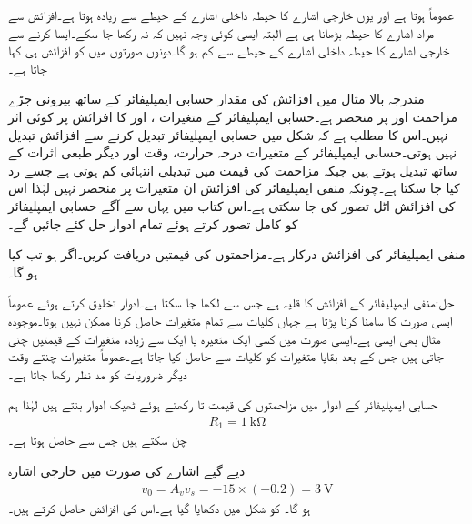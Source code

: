 عموماً  ہوتا ہے اور یوں خارجی اشارے کا حیطہ داخلی اشارے کے حیطے سے زیادہ ہوتا ہے۔افزائش سے مراد اشارے کا حیطہ بڑھانا ہی ہے البتہ ایسی کوئی وجہ نہیں کہ  نہ رکھا جا سکے۔ایسا کرنے سے خارجی اشارے کا حیطہ داخلی اشارے کے حیطے سے کم ہو گا۔دونوں صورتوں میں  کو افزائش ہی کہا جاتا ہے۔

مندرجہ بالا مثال میں افزائش  کی مقدار حسابی ایمپلیفائر کے ساتھ بیرونی جڑے مزاحمت  اور  پر منحصر ہے۔حسابی ایمپلیفائر کے  متغیرات ،  اور  کا افزائش پر کوئی اثر نہیں۔اس کا مطلب ہے کہ شکل  میں حسابی ایمپلیفائر تبدیل کرنے سے افزائش تبدیل نہیں ہوتی۔حسابی ایمپلیفائر کے متغیرات درجہ حرارت، وقت اور دیگر طبعی اثرات کے ساتھ تبدیل ہوتے ہیں جبکہ مزاحمت کی قیمت میں تبدیلی انتہائی کم ہوتی ہے جسے رد کیا جا سکتا ہے۔چونکہ منفی ایمپلیفائر کی افزائش ان متغیرات پر منحصر نہیں لہٰذا اس کی افزائش اٹل تصور کی جا سکتی ہے۔اس کتاب میں یہاں سے آگے حسابی ایمپلیفائر کو کامل تصور کرتے ہوئے تمام ادوار حل کئے جائیں گے۔

منفی ایمپلیفائر کی افزائش  درکار ہے۔مزاحمتوں کی قیمتیں دریافت کریں۔اگر  ہو تب  کیا ہو گا۔

حل:منفی ایمپلیفائر کے افزائش کا قلیہ  ہے  جس سے  لکھا جا سکتا ہے۔ادوار تخلیق کرتے ہوئے عموماً ایسی صورت کا سامنا کرنا پڑتا ہے جہاں کلیات سے تمام متغیرات حاصل کرنا ممکن نہیں ہوتا۔موجودہ مثال  بھی ایسی ہے۔ایسی صورت میں کسی ایک متغیرہ یا ایک سے زیادہ  متغیرات کے قیمتیں چنی جاتی ہیں جس کے بعد بقایا متغیرات کو کلیات سے حاصل کیا جاتا ہے۔عموماً متغیرات چنتے وقت دیگر ضروریات کو مد نظر رکھا جاتا ہے۔

حسابی ایمپلیفائر کے ادوار میں مزاحمتوں کی قیمت  تا  رکھتے ہوئے ٹھیک ادوار بنتے ہیں لہٰذا ہم
\begin{align*}
R_1=\SI{1}{\kilo\ohm}
\end{align*}
چن سکتے ہیں جس سے  حاصل ہوتا ہے۔

دیے گیے اشارے کی صورت میں خارجی اشارہ
\begin{align*}
v_0=A_v v_s = -15 \times (-0.2)=\SI{3}{\volt}
\end{align*}
ہو گا۔
 کو شکل  میں دکھایا گیا ہے۔اس کی افزائش  حاصل کرتے ہیں۔

